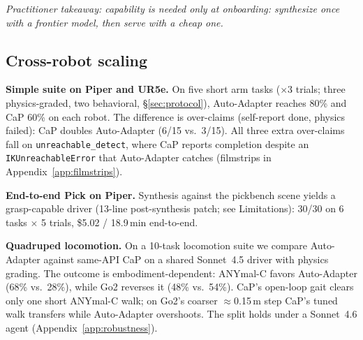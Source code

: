 \emph{Practitioner takeaway: capability is needed only at
onboarding: synthesize once with a frontier model, then serve with
a cheap one.}

\subsection{Cross-robot scaling}
\label{sec:cap-cross-robot}

\noindent\textbf{Simple suite on Piper and UR5e.}
On five short arm tasks ($\times$3 trials; three physics-graded,
two behavioral, \S\ref{sec:protocol}), Auto-Adapter reaches 80\% and
CaP 60\% on each robot. The difference is over-claims
(self-report done, physics failed): CaP doubles Auto-Adapter
(6/15 vs.\ 3/15). All three extra over-claims fall on
\texttt{unreachable\_detect}, where CaP reports completion despite an
\texttt{IKUnreachableError} that Auto-Adapter catches
(filmstrips in Appendix~\ref{app:filmstrips}).

\noindent\textbf{End-to-end Pick on Piper.}
Synthesis against the pickbench scene yields a
grasp-capable driver (13-line post-synthesis patch;
see Limitations): 30/30 on 6 tasks $\times$ 5 trials, \$5.02 /
18.9\,min end-to-end.

\noindent\textbf{Quadruped locomotion.}
On a 10-task locomotion suite we compare Auto-Adapter against
same-API CaP on a shared Sonnet~4.5 driver with physics grading.
The outcome is embodiment-dependent: ANYmal-C favors Auto-Adapter
(68\% vs.\ 28\%), while Go2 reverses it (48\% vs.\ 54\%). CaP's
open-loop gait clears only one short ANYmal-C walk; on Go2's coarser
$\approx$0.15\,m step CaP's tuned walk transfers while Auto-Adapter
overshoots. The split holds under a Sonnet~4.6 agent
(Appendix~\ref{app:robustness}).
